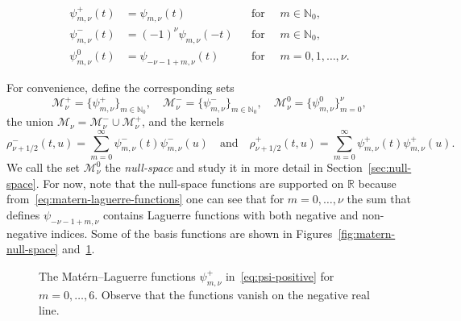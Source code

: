 \documentclass{article}
\newcommand{\tmem}[1]{{\em #1\/}}
\newcommand{\R}{\mathbb{R}}
\newcommand{\N}{\mathbb{N}}
\begin{document}
\begin{align}
  \psi_{m, \nu}^+ (t) & = \psi_{m, \nu} (t) &  & \text{for } \quad m \in \N_0,
  \label{eq:psi-positive}\\
  \psi_{m, \nu}^- (t) & = (- 1)^{\nu} \psi_{m, \nu}  (- t) &  & \text{for }
  \quad m \in \N_0,  \label{eq:psi-negative}\\
  \psi_{m, \nu}^0 (t) & = \psi_{- \nu - 1 + m, \nu} (t) &  & \text{for } \quad
  m = 0, 1, \ldots, \nu .  \label{eq:psi-null}
\end{align}

For convenience, define the corresponding sets
\[ \mathscr{M}_{\nu}^+ = \{ \psi_{m, \nu}^+ \}_{m \in \N_0}, \quad
   \mathscr{M}_{\nu}^- = \{ \psi_{m, \nu}^- \}_{m \in \N_0}, \quad
   \mathscr{M}_{\nu}^0 = \{ \psi_{m, \nu}^0 \}_{m = 0}^{\nu}, \]
the union $\mathscr{M}_{\nu} = \mathscr{M}_{\nu}^- \cup \mathscr{M}_{\nu}^+$,
and the kernels
\begin{equation}
  \label{eq:rho-kernels} \rho_{\nu + 1 / 2}^- (t, u) = \sum_{m = 0}^{\infty}
  \psi_{m, \nu}^- (t) \psi_{m, \nu}^- (u)  \quad \text{and} \quad \rho_{\nu +
  1 / 2}^+ (t, u) = \sum_{m = 0}^{\infty} \psi_{m, \nu}^+ (t) \psi_{m, \nu}^+
  (u) .
\end{equation}
We call the set $\mathscr{M}_{\nu}^0$ the {\tmem{null-space}} and study it in
more detail in  Section~\ref{sec:null-space}. For now, note that the
null-space functions are supported on $\R$ because
from~\eqref{eq:matern-laguerre-functions} one can see that for $m = 0, \ldots,
\nu$ the sum that defines $\psi_{- \nu - 1 + m, \nu}$ contains Laguerre
functions with both negative and non-negative indices. Some of the basis
functions are shown in  Figures~\ref{fig:matern-null-space}
and~\ref{fig:matern-non-null-space}.

\begin{figure}[h]
  \begin{center}
    \label{fig:matern-non-null-space}
  \end{center}
  \caption{The Mat{\'e}rn--Laguerre functions $\psi_{m, \nu}^+$
  in~\eqref{eq:psi-positive} for $m = 0, \ldots, 6$. Observe that the
  functions vanish on the negative real line.}
\end{figure}
\end{document}
